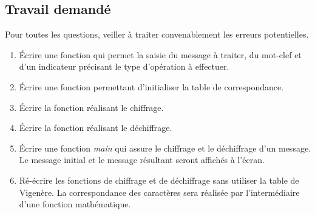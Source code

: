 \subsection{Travail demandé}

Pour toutes les questions, veiller à traiter convenablement les erreurs potentielles.
\begin{enumerate}
  \item Écrire une fonction qui permet la saisie du message à traiter, du mot-clef et d'un indicateur précisant le type d'opération à effectuer.
  \item Écrire une fonction permettant d'initialiser la table de correspondance.
  \item Écrire la fonction réalisant le chiffrage.
  \item Écrire la fonction réalisant le déchiffrage.
  \item Écrire une fonction \textit{main} qui assure le chiffrage et le déchiffrage d'un message. Le message initial et le message résultant seront affichés à l'écran.
  \item Ré-écrire les fonctions de chiffrage et de déchiffrage sans utiliser la table de Vigenère. La correspondance des caractères sera réalisée par l'intermédiaire d'une fonction mathématique.
\end{enumerate}
